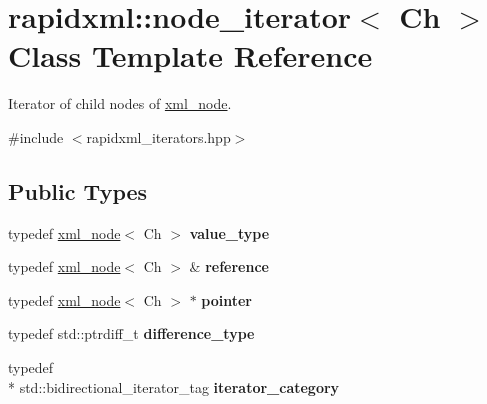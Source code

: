 \hypertarget{classrapidxml_1_1node__iterator}{\section{rapidxml\-:\-:node\-\_\-iterator$<$ Ch $>$ Class Template Reference}
\label{classrapidxml_1_1node__iterator}
}


Iterator of child nodes of \hyperlink{classrapidxml_1_1xml__node}{xml\-\_\-node}.  




{\ttfamily \#include $<$rapidxml\-\_\-iterators.\-hpp$>$}

\subsection*{Public Types}
\begin{DoxyCompactItemize}
\item 
\hypertarget{classrapidxml_1_1node__iterator_ade6310119ed1f72c94830e006fac69b7}{typedef \hyperlink{classrapidxml_1_1xml__node}{xml\-\_\-node}$<$ Ch $>$ {\bfseries value\-\_\-type}}\label{classrapidxml_1_1node__iterator_ade6310119ed1f72c94830e006fac69b7}

\item 
\hypertarget{classrapidxml_1_1node__iterator_ad7fabbcb7d3d9e4e220299c5475b9e9c}{typedef \hyperlink{classrapidxml_1_1xml__node}{xml\-\_\-node}$<$ Ch $>$ \& {\bfseries reference}}\label{classrapidxml_1_1node__iterator_ad7fabbcb7d3d9e4e220299c5475b9e9c}

\item 
\hypertarget{classrapidxml_1_1node__iterator_a65dca8bca2b9c29f635b9ad0bdeeecb9}{typedef \hyperlink{classrapidxml_1_1xml__node}{xml\-\_\-node}$<$ Ch $>$ $\ast$ {\bfseries pointer}}\label{classrapidxml_1_1node__iterator_a65dca8bca2b9c29f635b9ad0bdeeecb9}

\item 
\hypertarget{classrapidxml_1_1node__iterator_a5bdc462b980a52c5fa2d99ac9f4f4bff}{typedef std\-::ptrdiff\-\_\-t {\bfseries difference\-\_\-type}}\label{classrapidxml_1_1node__iterator_a5bdc462b980a52c5fa2d99ac9f4f4bff}

\item 
\hypertarget{classrapidxml_1_1node__iterator_a8e82d75f768e17bf7349d010ee26c037}{typedef \\*
std\-::bidirectional\-\_\-iterator\-\_\-tag {\bfseries iterator\-\_\-category}}\label{classrapidxml_1_1node__iterator_a8e82d75f768e17bf7349d010ee26c037}

\end{DoxyCompactItemize}

